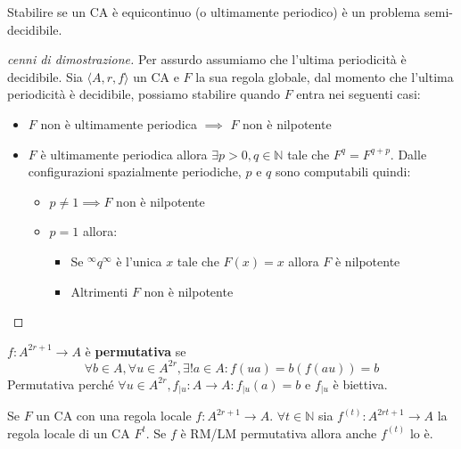 \begin{teorema}
    Stabilire se un CA è equicontinuo (o ultimamente periodico) è un problema semi-decidibile.
    \begin{proof} [cenni di dimostrazione]
        Per assurdo assumiamo che l'ultima periodicità è decidibile. Sia 
        $\langle A,r,f\rangle$  un CA e $F$ la sua regola globale, dal momento
        che l'ultima periodicità è decidibile, possiamo stabilire quando $F$ entra 
        nei seguenti casi:
        \begin{itemize}
            \item $F$ non è ultimamente periodica $\implies$ $F$ non è nilpotente
            \item $F$ è ultimamente periodica allora $\exists p>0, q\in \mathbb{N}$
            tale che $F^q=F^{q+p}$. Dalle configurazioni spazialmente periodiche,
            $p$ e $q$ sono computabili quindi:
            \begin{itemize}
                \item $p\ne 1\implies F$ non è nilpotente
                \item $p= 1$ allora:
                \begin{itemize}
                    \item Se $^\infty q^\infty$ è l'unica $x$ tale che $F(x)=x$ allora
                    $F$ è nilpotente
                    \item Altrimenti $F$ non è nilpotente
                \end{itemize}
            \end{itemize}
        \end{itemize}
    \end{proof}
\end{teorema}

\begin{definizione}
    $f:A^{2r+1}\rightarrow A$ è \textbf{permutativa} se 
    $$\forall b\in A, \forall u \in A^{2r}, \exists ! a\in A: f(ua)=b (f(au))=b$$
    Permutativa perché $\forall u \in A^{2r}, f_{|u}:A\rightarrow A:f_{|u}(a) = b$
    e $f_{|u}$ è biettiva.
\end{definizione}

\begin{teorema}
    Se $F$ un CA con una regola locale $f:A^{2r+1}\rightarrow A$. $\forall t\in \mathbb{N}$
    sia $f^{(t)}:A^{2rt+1}\rightarrow A$ la regola locale di un CA $F^t$. Se $f$
    è RM/LM permutativa allora anche $f^{(t)}$ lo è.
\end{teorema}

